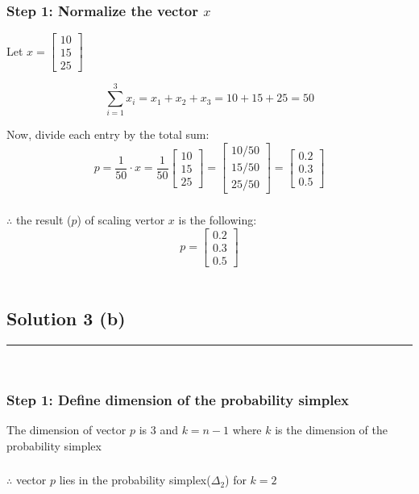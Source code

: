\documentclass{article}
\begin{document}
\subsubsection*{Step 1: Normalize the vector $x$}
\parbox{\textwidth}{
Let $x = \begin{bmatrix} 10 \\ 15 \\ 25 \end{bmatrix}$

$$\sum_{i=1}^{3} x_{i} = x_{1} + x_{2} + x_{3} = 10 + 15 + 25 = 50$$

Now, divide each entry by the total sum:\\

$$p = \frac{1}{50} \cdot x = \frac{1}{50} \begin{bmatrix} 10 \\ 15 \\ 25 \end{bmatrix} = \begin{bmatrix} 10/50 \\ 15/50 \\ 25/50 \end{bmatrix} = \begin{bmatrix} 0.2 \\ 0.3 \\ 0.5 \end{bmatrix}$$
}
\subsubsection*{\normalfont}{$\therefore$ the result ($p$) of scaling vertor $x$ is the following:}
$$p = \begin{bmatrix} 0.2 \\ 0.3 \\ 0.5 \end{bmatrix}$$ \\

\subsection*{Solution 3 (b)}
\noindent\rule{\textwidth}{0.4pt}\\
\subsubsection*{Step 1: Define dimension of the probability simplex}
\parbox{\textwidth}{
The dimension of vector $p$ is $3$ and $k=n-1$ where $k$ is the dimension of the probability simplex
}
\subsubsection*{\normalfont}{$\therefore$ vector $p$ lies in the probability simplex($\Delta_2$) for $k=2$}
\end{document}
